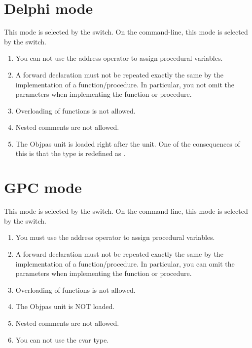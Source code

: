 \section{Delphi mode}
This mode is selected by the  switch. On the command-line,
this mode is selected by the  switch.
\begin{enumerate}
\item You can not use the address operator to assign procedural variables.
\item A forward declaration must not be repeated exactly the same by the
implementation of a function/procedure. In particular, you not omit the
parameters when implementing the function or procedure.
\item Overloading of functions is not allowed.
\item Nested comments are not  allowed.
\item The Objpas unit is loaded right after the  unit. One of the
consequences of this is that the type  is redefined as
.
\end{enumerate}
\section{GPC mode}
This mode is selected by the  switch. On the command-line,
this mode is selected by the  switch.
\begin{enumerate}
\item You must use the address operator to assign procedural variables.
\item A forward declaration must not be repeated exactly the same by the
implementation of a function/procedure. In particular, you can omit the
parameters when implementing the function or procedure.
\item Overloading of functions is not allowed.
\item The Objpas unit is NOT loaded.
\item Nested comments are not allowed.
\item You can not use the cvar type.
\end{enumerate}
